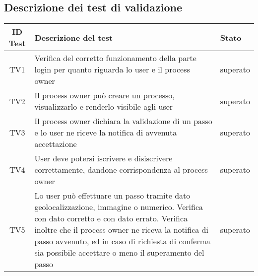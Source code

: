 \subsection{Descrizione dei test di validazione}
\begin{small}\centering
\begin{tabular}{|c|p{8.0cm}|p{2.0cm}|}
\hline
\textbf{ID Test} & \textbf{Descrizione del test} & \textbf{Stato}\\
\hline
TV1& Verifica del corretto funzionamento della parte login per quanto riguarda lo user e il process owner & superato\\
\hline
TV2& Il process owner può creare un processo, visualizzarlo e renderlo visibile agli user&superato\\
\hline
TV3& Il process owner dichiara la validazione di un passo e lo user ne riceve la notifica di avvenuta accettazione&superato\\
\hline
TV4& User deve potersi iscrivere e disiscrivere correttamente, dandone corrispondenza al process owner&superato\\
\hline
TV5& Lo user può effettuare un passo tramite dato geolocalizzazione, immagine o numerico. Verifica con dato corretto e con dato errato. Verifica inoltre che il process owner ne riceva la notifica di passo avvenuto, ed in caso di richiesta di conferma sia possibile accettare o meno il superamento del passo&superato\\
\hline
\end{tabular}\\
\end{small}



